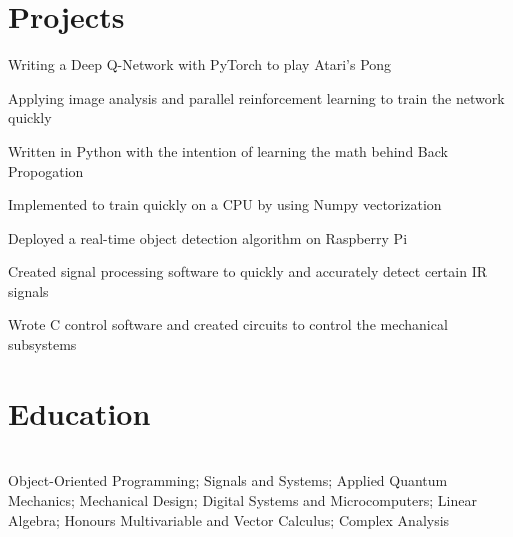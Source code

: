 \documentclass[]{deedy-resume-openfont}
\begin{document}
\section{Projects}

\begin{tightemize}
	\item Writing a Deep Q-Network with PyTorch to play Atari's Pong
	\item Applying image analysis and parallel reinforcement learning to train the network quickly
\end{tightemize}

\begin{tightemize}
	\item Written in Python with the intention of learning the math behind Back Propogation 
	\item Implemented to train quickly on a CPU by using Numpy vectorization
\end{tightemize}

\begin{tightemize}
	\item Deployed a real-time object detection algorithm on Raspberry Pi
	\item Created signal processing software to quickly and accurately detect certain IR signals
	\item Wrote C control software and created circuits to control the mechanical subsystems
\end{tightemize}

\vspace{12pt}


\section{Education}

\begin{adjustwidth}{0.55cm}{1.25cm}
	 \\
	 Object-Oriented Programming; Signals and Systems; Applied Quantum Mechanics; Mechanical Design; Digital Systems and Microcomputers; Linear Algebra; Honours Multivariable and Vector Calculus; Complex Analysis
\end{adjustwidth}
\vspace{8pt}
\end{document}
